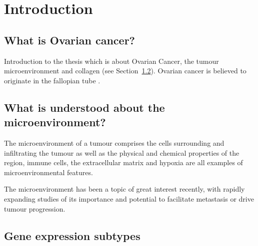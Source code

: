 
\chapter{Introduction}  %

\ifpdf
    \graphicspath{{Introduction/Figs/Raster/}{Introduction/Figs/PDF/}{Introduction/Figs/}}
\else
    \graphicspath{{Introduction/Figs/Vector/}{Introduction/Figs/}}
\fi


\section{What is Ovarian cancer?} %

Introduction to the thesis which is about Ovarian Cancer, the tumour microenvironment and collagen (see 
Section~\ref{section1.3}). Ovarian cancer is believed to originate in the fallopian tube \citep{AAB95,Con90,LM65}.



\section{What is understood about the microenvironment?}  %
\label{section1.3}
The microenvironment of a tumour comprises the cells surrounding and infiltrating the tumour as well as the physical and chemical properties of the region, immune cells, the extracellular matrix and hypoxia are all examples of microenvironmental features.

The microenvironment has been a topic of great interest recently, with rapidly expanding studies of its importance and potential to facilitate metastasis or drive tumour progression. \citep{RN22, RN10, RN37,RN11, RN2, RN26}

\section{Gene expression subtypes}

